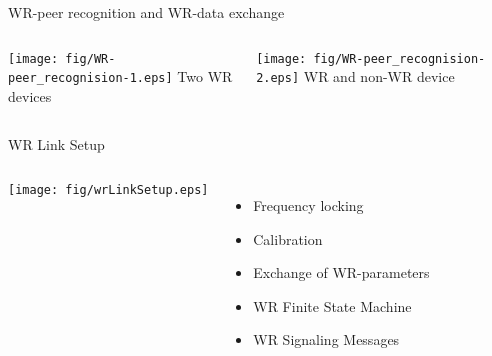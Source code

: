 \documentclass[compress,red]{beamer}
\begin{document}
\begin{frame}{WR-peer recognition and WR-data exchange}

  \begin{columns}[c]

    \begin{center}
    \texttt{[image: fig/WR-peer\_recognision-1.eps]}
    \newline
    Two WR devices
    \end{center}
    

    \begin{center}
    \texttt{[image: fig/WR-peer\_recognision-2.eps]}
    \newline
    WR and non-WR device
    \end{center}
     
  \end{columns}

\end{frame}
\begin{frame}{WR Link Setup }

  \begin{columns}[c]

      \begin{center}
      \texttt{[image: fig/wrLinkSetup.eps]}
      \end{center}



      \begin{itemize}
	\item Frequency locking
	\item Calibration
	\item Exchange of WR-parameters
	\item WR Finite State Machine
	\item WR Signaling Messages
      \end{itemize}

  \end{columns}

\end{frame}
\end{document}
